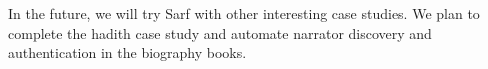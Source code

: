 \documentclass[11pt]{article}
\begin{document}
In the future, 
we will try Sarf with other interesting case studies.
We plan to complete the hadith case study 
and automate narrator discovery and authentication in the 
biography books. 









%

{\small }
\end{document}
